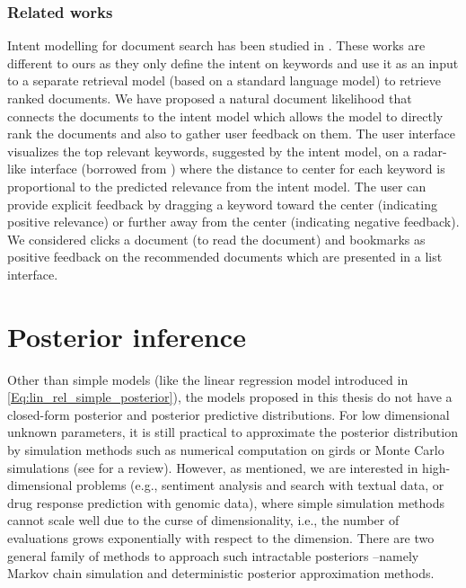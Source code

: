 \documentclass[dissertation,math,vertlayout,pdfa,colorlinks]{aaltoseries}
\begin{document}
\subsubsection{Related works}
Intent modelling for document search has been studied in  \cite{GlowIUI2013,ruotsalo2015interactive,Ruotsalo2018}. These works are different to ours as they only define the intent on keywords and use it as an input to a separate retrieval model (based on a standard language model) to retrieve ranked documents. We have proposed a natural document likelihood that connects the documents to the intent model which allows the model to directly rank the documents and also to gather user feedback on them. The user interface visualizes the top relevant keywords, suggested by the intent model, on a radar-like interface (borrowed from \cite{GlowIUI2013}) where the distance to center for each keyword is proportional to the predicted relevance from the intent model. The user can provide explicit feedback by dragging a keyword toward the center (indicating positive relevance) or further away from the center (indicating negative feedback). We considered clicks a document (to read the document) and bookmarks as positive feedback on the recommended documents which are presented in a list interface. 



\section{Posterior inference} \label{posteriro_inf}
Other than simple models (like the linear regression model introduced in \ref{Eq:lin_rel_simple_posterior}), the models proposed in this thesis do not have a closed-form posterior and posterior predictive distributions. For low dimensional unknown parameters, it is still practical to approximate the posterior distribution by simulation methods such as numerical computation on girds or Monte Carlo simulations (see \cite[Chapter~10]{Gelman2013} for a review). However, as mentioned, we are interested in high-dimensional problems (e.g., sentiment analysis and search with textual data, or drug response prediction with genomic data), where simple simulation methods cannot scale well due to the curse of dimensionality, i.e., the number of evaluations grows exponentially with respect to the dimension. There are two general family of methods to approach such intractable posteriors --namely Markov chain simulation and deterministic posterior approximation methods.
\end{document}

